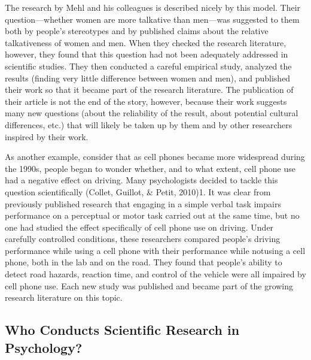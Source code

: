 The research by Mehl and his colleagues is described nicely by this model. Their question---whether women are more talkative than men---was suggested to them both by people's stereotypes and by published claims about the relative talkativeness of women and men. When they checked the research literature, however, they found that this question had not been adequately addressed in scientific studies. They then conducted a careful empirical study, analyzed the results (finding very little difference between women and men), and published their work so that it became part of the research literature. The publication of their article is not the end of the story, however, because their work suggests many new questions (about the reliability of the result, about potential cultural differences, etc.) that will likely be taken up by them and by other researchers inspired by their work.

As another example, consider that as cell phones became more widespread during the 1990s, people began to wonder whether, and to what extent, cell phone use had a negative effect on driving. Many psychologists decided to tackle this question scientifically (Collet, Guillot, \& Petit, 2010)1. It was clear from previously published research that engaging in a simple verbal task impairs performance on a perceptual or motor task carried out at the same time, but no one had studied the effect specifically of cell phone use on driving. Under carefully controlled conditions, these researchers compared people's driving performance while using a cell phone with their performance while notusing a cell phone, both in the lab and on the road. They found that people's ability to detect road hazards, reaction time, and control of the vehicle were all impaired by cell phone use. Each new study was published and became part of the growing research literature on this topic.

\subsection{Who Conducts Scientific Research in Psychology?}

